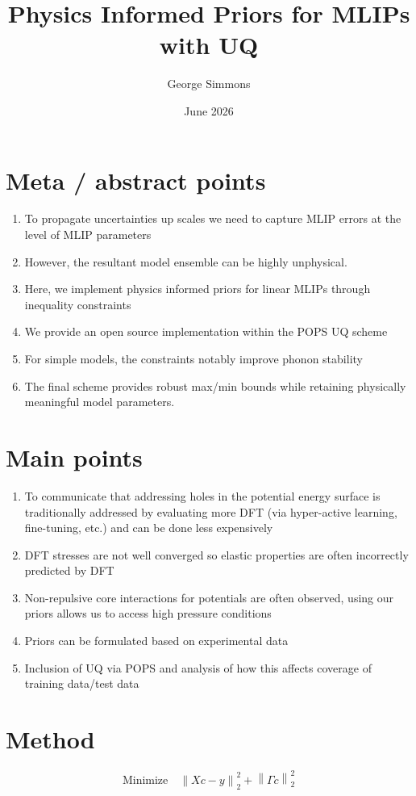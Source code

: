 \documentclass{article}
\title{Physics Informed Priors for MLIPs with UQ}
\author{George Simmons}
\date{June 2026}
\begin{document}
\maketitle
\vspace{2pc}
\section{Meta / abstract points}
\begin{enumerate}
    \item To propagate uncertainties up scales we need to capture MLIP errors at the level of MLIP parameters
    \item However, the resultant model ensemble can be highly unphysical.
    \item Here, we implement physics informed priors for linear MLIPs through inequality constraints
    \item We provide an open source implementation within the POPS UQ scheme
    \item For simple models, the constraints notably improve phonon stability 
    \item The final scheme provides robust max/min bounds while retaining physically meaningful model parameters. 
\end{enumerate}
\section{Main points}
\begin{enumerate}
    \item To communicate that addressing holes in the potential energy surface is traditionally addressed by evaluating more DFT (via hyper-active learning, fine-tuning, etc.) and can be done less expensively
    \item DFT stresses are not well converged so elastic properties are often incorrectly predicted by DFT
    \item Non-repulsive core interactions for potentials are often observed, using our priors allows us to access high pressure conditions
    \item Priors can be formulated based on experimental data
    \item Inclusion of UQ via POPS and analysis of how this affects coverage of training data/test data
\end{enumerate}

\section{Method}
\begin{equation}
        \text{Minimize}\quad  \left\| Xc-y \right\|_2^2 + \left\| \Gamma c \right\|_2^2
\end{equation}
\end{document}
